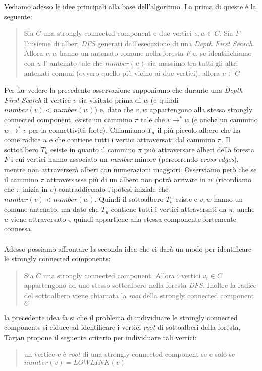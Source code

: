 Vediamo adesso le idee principali alla base dell'algoritmo. La prima
di queste \`e la seguente:
\begin{quotation}
  Sia $C$ una strongly connected component e due vertici $v, w \in
  C$. Sia $F$ l'insieme di alberi \emph{DFS} generati dall'esecuzione
  di una \emph{Depth First Search}. Allora $v, w$ hanno un antenato
  comune nella foresta $F$ e, se identifichiamo con $u$ l' antenato
  tale che $number(u)$ sia massimo tra tutti gli altri antenati comuni
  (ovvero quello pi\`u vicino ai due vertici), allora $u \in C$
\end{quotation}
Per far vedere la precedente osservazione supponiamo che durante una
\emph{Depth First Search} il vertice $v$ sia visitato prima di $w$ (e
quindi $number(v) < number(w)$) e, dato che $v,w$ appartengono alla
stessa strongly connected component, esiste un cammino $\pi$ tale che
$v \rightarrow^{*} w$ (e anche un cammino $w \rightarrow^{*} v$ per la
connettivit\`a forte). Chiamiamo $T_{u}$ il pi\`u piccolo albero che
ha come radice $u$ e che contiene tutti i vertici attraversati dal
cammino $\pi$. Il sottoalbero $T_{u}$ esiste in quanto il cammino
$\pi$ pu\`o attraversare alberi della foresta $F$ i cui vertici hanno
associato un \emph{number} minore (percorrendo \emph{cross edges}),
mentre non attraverser\`a alberi con numerazioni maggiori. Osserviamo
per\`o che se il cammino $\pi$ attraversasse pi\`u di un albero non
potr\`a arrivare in $w$ (ricordiamo che $\pi$ inizia in $v$)
contraddicendo l'ipotesi iniziale che $number(v) < number(w)$. Quindi
il sottoalbero $T_{u}$ esiste e $v,w$ hanno un comune antenato, ma
dato che $T_{u}$ contiene tutti i vertici attraversati da $\pi$, anche
$u$ viene attraversato e quindi appartiene alla stessa componente
fortemente connessa.
\\\\
Adesso possiamo affrontare la seconda idea che ci dar\`a un modo per
identificare le strongly connected components:
\begin{quotation}
  Sia $C$ una strongly connected component. Allora i vertici $v_{i}
  \in C$ appartengono ad uno stesso sottoalbero nella foresta
  \emph{DFS}. Inoltre la radice del sottoalbero viene chiamata la
  \emph{root} della strongly connected component $C$
\end{quotation}
la precedente idea fa si che il problema di individuare le strongly
connected components si riduce ad identificare i vertici \emph{root} di
sottoalberi della foresta. Tarjan propone il seguente criterio per
individuare tali vertici:
\begin{quotation}
  un vertice $v$ \`e \emph{root} di una strongly connected component
  se e solo se $number(v) = LOWLINK(v)$ 
\end{quotation}
